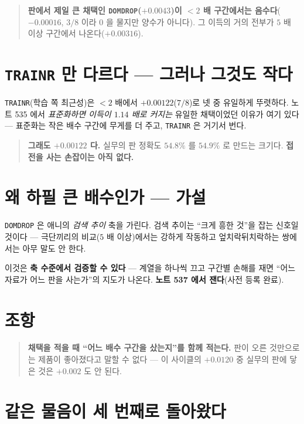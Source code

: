 \documentclass[11pt]{article}
\begin{document}
\begin{quote}
\textbf{판에서 제일 큰 채택인 \texttt{DOMDROP}($+0.0043$)이 $<2$ 배 구간에서는
음수다}($-0.00016$, $3/8$ 이라 $0$ 을 물지만 양수가 아니다). 그 이득의 거의
전부가 $5$ 배 이상 구간에서 나온다($+0.00316$).
\end{quote}

\section{\texttt{TRAINR} 만 다르다 --- 그러나 그것도 작다}

\texttt{TRAINR}(학습 쪽 최근성)은 $<2$ 배에서 $+0.00122$($7/8$)로 넷 중 유일하게
뚜렷하다. 노트 535 에서 \emph{표준화하면 이득이 $1.14$ 배로 커지는} 유일한
채택이었던 이유가 여기 있다 --- 표준화는 작은 배수 구간에 무게를 더 주고,
\texttt{TRAINR} 은 거기서 번다.

\begin{quote}
\textbf{그래도 $+0.00122$ 다.} 실무의 판 정확도 $54.8\%$ 를 $54.9\%$ 로 만드는
크기다. \textbf{접전을 사는 손잡이는 아직 없다.}
\end{quote}

\section{왜 하필 큰 배수인가 --- 가설}

\texttt{DOMDROP} 은 애니의 \emph{검색 추이} 축을 가린다. 검색 추이는 ``크게
흥한 것''을 잡는 신호일 것이다 --- 극단끼리의 비교($5$ 배 이상)에서는 강하게
작동하고 엎치락뒤치락하는 쌍에서는 아무 말도 안 한다.

이것은 \textbf{축 수준에서 검증할 수 있다} --- 계열을 하나씩 끄고 구간별 손해를
재면 ``어느 자료가 어느 판을 사는가''의 지도가 나온다. \textbf{노트 537 에서
잰다}(사전 등록 완료).

\section*{조항}

\begin{quote}
\textbf{채택을 적을 때 ``어느 배수 구간을 샀는지''를 함께 적는다.} 판이 오른
것만으로는 제품이 좋아졌다고 말할 수 없다 --- 이 사이클의 $+0.0120$ 중 실무의
판에 닿은 것은 $+0.002$ 도 안 된다.
\end{quote}

\section*{같은 물음이 세 번째로 돌아왔다}
\end{document}

